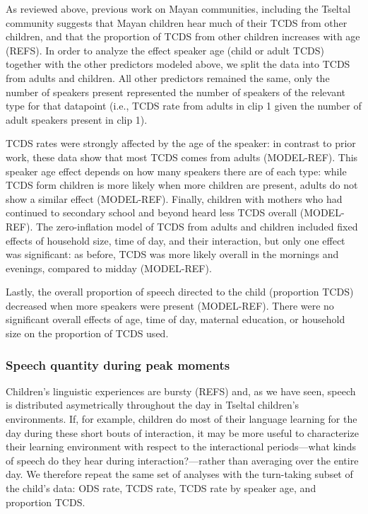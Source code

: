 \documentclass[floatsintext,man]{apa6}
\theoremstyle{definition}
\theoremstyle{definition}
\theoremstyle{definition}
\theoremstyle{remark}
\begin{document}
As reviewed above, previous work on Mayan communities, including the
Tseltal community suggests that Mayan children hear much of their TCDS
from other children, and that the proportion of TCDS from other children
increases with age (REFS). In order to analyze the effect speaker age
(child or adult TCDS) together with the other predictors modeled above,
we split the data into TCDS from adults and children. All other
predictors remained the same, only the number of speakers present
represented the number of speakers of the relevant type for that
datapoint (i.e., TCDS rate from adults in clip 1 given the number of
adult speakers present in clip 1).

TCDS rates were strongly affected by the age of the speaker: in contrast
to prior work, these data show that most TCDS comes from adults
(MODEL-REF). This speaker age effect depends on how many speakers there
are of each type: while TCDS form children is more likely when more
children are present, adults do not show a similar effect (MODEL-REF).
Finally, children with mothers who had continued to secondary school and
beyond heard less TCDS overall (MODEL-REF). The zero-inflation model of
TCDS from adults and children included fixed effects of household size,
time of day, and their interaction, but only one effect was significant:
as before, TCDS was more likely overall in the mornings and evenings,
compared to midday (MODEL-REF).

Lastly, the overall proportion of speech directed to the child
(proportion TCDS) decreased when more speakers were present (MODEL-REF).
There were no significant overall effects of age, time of day, maternal
education, or household size on the proportion of TCDS used.

\subsubsection{Speech quantity during peak
moments}\label{speech-quantity-during-peak-moments}

Children's linguistic experiences are bursty (REFS) and, as we have
seen, speech is distributed asymetrically throughout the day in Tseltal
children's environments. If, for example, children do most of their
language learning for the day during these short bouts of interaction,
it may be more useful to characterize their learning environment with
respect to the interactional periods---what kinds of speech do they hear
during interaction?---rather than averaging over the entire day. We
therefore repeat the same set of analyses with the turn-taking subset of
the child's data: ODS rate, TCDS rate, TCDS rate by speaker age, and
proportion TCDS.
\end{document}
